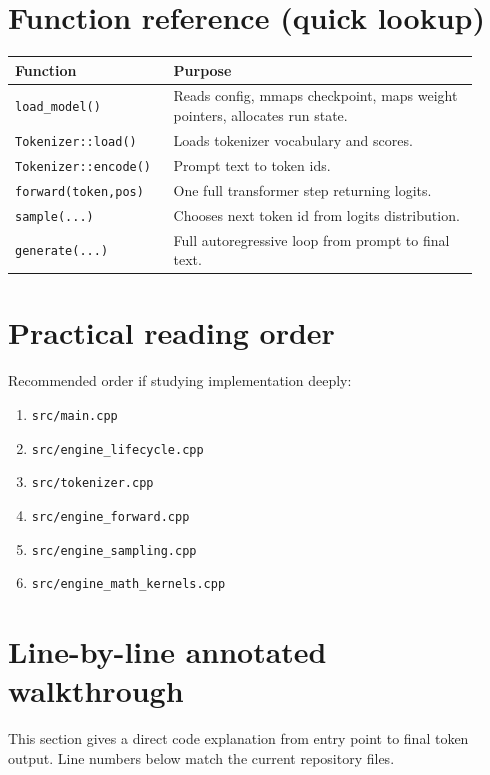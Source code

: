 \documentclass[11pt]{article}
\begin{document}
\section{Function reference (quick lookup)}
\begin{longtable}{p{0.3\linewidth} p{0.62\linewidth}}
\toprule
\textbf{Function} & \textbf{Purpose} \\
\midrule
\endhead
\texttt{load\_model()} & Reads config, mmaps checkpoint, maps weight pointers, allocates run state. \\
\texttt{Tokenizer::load()} & Loads tokenizer vocabulary and scores. \\
\texttt{Tokenizer::encode()} & Prompt text to token ids. \\
\texttt{forward(token,pos)} & One full transformer step returning logits. \\
\texttt{sample(...)} & Chooses next token id from logits distribution. \\
\texttt{generate(...)} & Full autoregressive loop from prompt to final text. \\
\bottomrule
\end{longtable}

\section{Practical reading order}
Recommended order if studying implementation deeply:
\begin{enumerate}[leftmargin=*]
  \item \texttt{src/main.cpp}
  \item \texttt{src/engine\_lifecycle.cpp}
  \item \texttt{src/tokenizer.cpp}
  \item \texttt{src/engine\_forward.cpp}
  \item \texttt{src/engine\_sampling.cpp}
  \item \texttt{src/engine\_math\_kernels.cpp}
\end{enumerate}

\newpage
\section{Line-by-line annotated walkthrough}
This section gives a direct code explanation from entry point to final token output.
Line numbers below match the current repository files.
\end{document}
